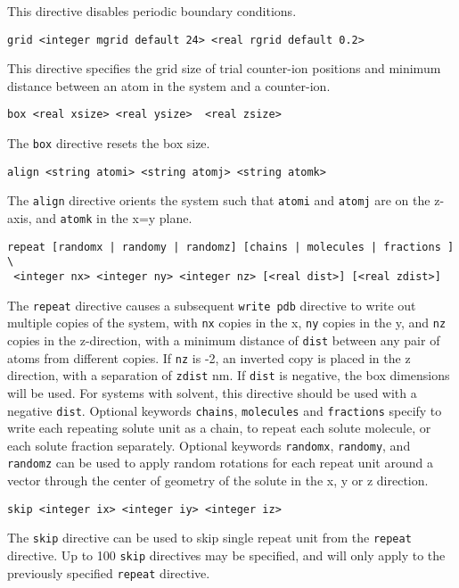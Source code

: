 This directive disables periodic boundary conditions.

\begin{verbatim}
grid <integer mgrid default 24> <real rgrid default 0.2>
\end{verbatim}

This directive specifies the grid size of trial counter-ion positions and 
minimum distance between an atom in the system and a counter-ion. 

%
%
\begin{verbatim}
box <real xsize> <real ysize>  <real zsize>
\end{verbatim}

The \verb+box+ directive resets the box size.

\begin{verbatim}
align <string atomi> <string atomj> <string atomk>
\end{verbatim}

The \verb+align+ directive orients the system such that
\verb+atomi+ and \verb+atomj+ are on the z-axis, and \verb+atomk+
in the x=y plane.

\begin{verbatim}
repeat [randomx | randomy | randomz] [chains | molecules | fractions ] \
 <integer nx> <integer ny> <integer nz> [<real dist>] [<real zdist>]
\end{verbatim}

The \verb+repeat+ directive causes a subsequent \verb+write pdb+
directive to write out multiple copies of the system, with \verb+nx+
copies in the x, \verb+ny+ copies in the y, and \verb+nz+ copies in 
the z-direction, with a minimum distance of \verb+dist+ between any
pair of atoms from different copies. If \verb+nz+ is -2, an inverted
copy is placed in the z direction, with a separation of \verb+zdist+ nm. 
If \verb+dist+ is negative, the box dimensions will be used. 
For systems with solvent, this directive should be used with a negative 
\verb+dist+.
Optional keywords \verb+chains+, \verb+molecules+ and \verb+fractions+
specify to write each repeating solute unit as a chain, to repeat
each solute molecule, or each solute fraction separately. Optional
keywords \verb+randomx+, \verb+randomy+, and \verb+randomz+ can be used 
to apply random rotations for each repeat unit around a vector through
the center of geometry of the solute in the x, y or z direction.

\begin{verbatim}
skip <integer ix> <integer iy> <integer iz>
\end{verbatim}

The \verb+skip+ directive can be used to skip single repeat unit
from the \verb+repeat+ directive. Up to 100 \verb+skip+ directives 
may be specified, and will only apply to the previously specified
\verb+repeat+ directive. 
